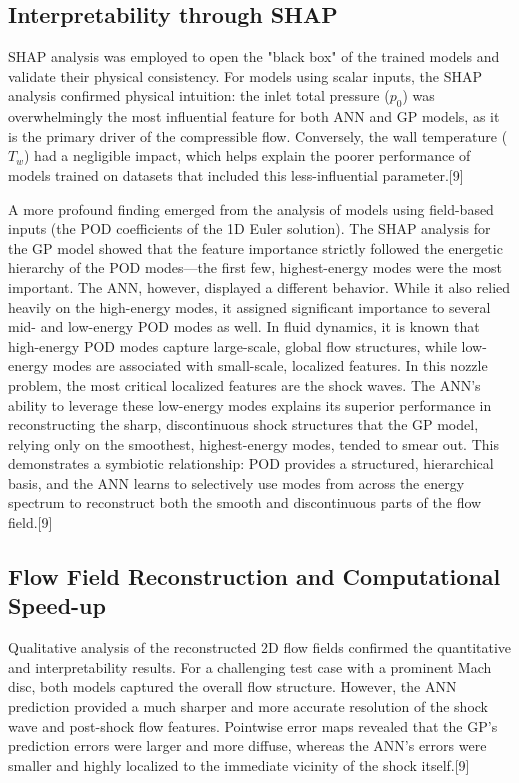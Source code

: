\documentclass[12pt, a4paper]{report}
\begin{document}
\subsection{Interpretability through SHAP}
SHAP analysis was employed to open the "black box" of the trained models and validate their physical consistency. For models using scalar inputs, the SHAP analysis confirmed physical intuition: the inlet total pressure ($p_0$) was overwhelmingly the most influential feature for both ANN and GP models, as it is the primary driver of the compressible flow. Conversely, the wall temperature ($T_w$) had a negligible impact, which helps explain the poorer performance of models trained on datasets that included this less-influential parameter.[9]

A more profound finding emerged from the analysis of models using field-based inputs (the POD coefficients of the 1D Euler solution). The SHAP analysis for the GP model showed that the feature importance strictly followed the energetic hierarchy of the POD modes—the first few, highest-energy modes were the most important. The ANN, however, displayed a different behavior. While it also relied heavily on the high-energy modes, it assigned significant importance to several mid- and low-energy POD modes as well. In fluid dynamics, it is known that high-energy POD modes capture large-scale, global flow structures, while low-energy modes are associated with small-scale, localized features. In this nozzle problem, the most critical localized features are the shock waves. The ANN's ability to leverage these low-energy modes explains its superior performance in reconstructing the sharp, discontinuous shock structures that the GP model, relying only on the smoothest, highest-energy modes, tended to smear out. This demonstrates a symbiotic relationship: POD provides a structured, hierarchical basis, and the ANN learns to selectively use modes from across the energy spectrum to reconstruct both the smooth and discontinuous parts of the flow field.[9]

\subsection{Flow Field Reconstruction and Computational Speed-up}
Qualitative analysis of the reconstructed 2D flow fields confirmed the quantitative and interpretability results. For a challenging test case with a prominent Mach disc, both models captured the overall flow structure. However, the ANN prediction provided a much sharper and more accurate resolution of the shock wave and post-shock flow features. Pointwise error maps revealed that the GP's prediction errors were larger and more diffuse, whereas the ANN's errors were smaller and highly localized to the immediate vicinity of the shock itself.[9]
\end{document}
